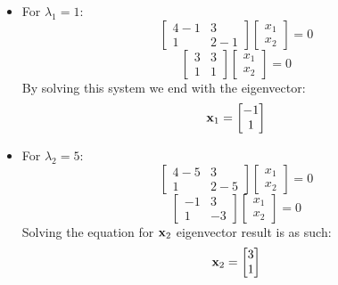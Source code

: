 \begin{itemize}
    \item For $\lambda_1 = 1$:
        \begin{equation*}
            \begin{bmatrix}
                4 - 1 & 3 \\
                1 & 2 - 1
            \end{bmatrix}
            \begin{bmatrix}
                x_1 \\
                x_2
            \end{bmatrix} = 0
        \end{equation*}
        \begin{equation*}
            \begin{bmatrix}
                3 & 3 \\
                1 & 1
            \end{bmatrix}
            \begin{bmatrix}
                x_1 \\
                x_2
            \end{bmatrix} = 0
        \end{equation*}
        By solving this system we end with the eigenvector:
        \begin{equation*}
            \mathbf{x}_1 = 
            \begin{bmatrix}
                -1 \\
                1
            \end{bmatrix} 
        \end{equation*} 
    \item For $\lambda_2 = 5$:
    \begin{equation*}
        \begin{bmatrix}
            4 - 5 & 3 \\
            1 & 2 - 5
        \end{bmatrix}
        \begin{bmatrix}
            x_1 \\
            x_2
        \end{bmatrix} = 0
    \end{equation*}
    \begin{equation*}
        \begin{bmatrix}
            -1 & 3 \\
            1 & -3
        \end{bmatrix}
        \begin{bmatrix}
            x_1 \\
            x_2
        \end{bmatrix} = 0
    \end{equation*}
    Solving the equation for $\mathbf{x}_2$ eigenvector result is as such:
    \begin{equation*}
        \mathbf{x}_2 = 
        \begin{bmatrix}
            3 \\
            1
        \end{bmatrix} 
    \end{equation*} 
\end{itemize}

